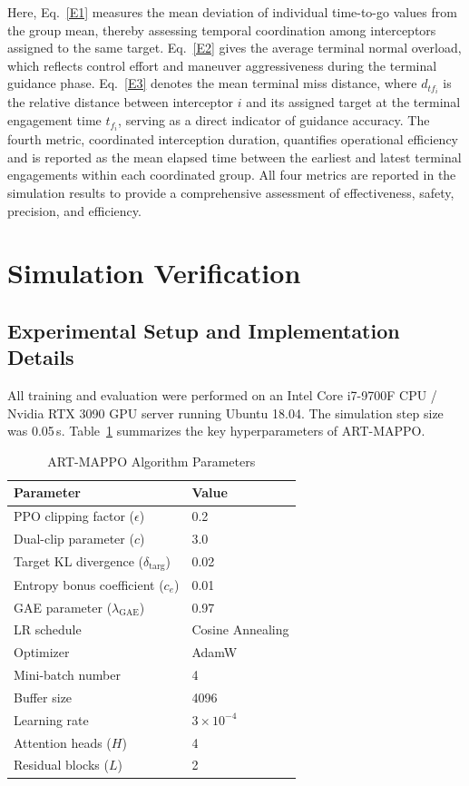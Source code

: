 \documentclass[lettersize,journal]{IEEEtran}
\begin{document}
Here, Eq.~\eqref{E1} measures the mean deviation of individual time-to-go values from the group mean, thereby assessing temporal coordination among interceptors assigned to the same target. Eq.~\eqref{E2} gives the average terminal normal overload, which reflects control effort and maneuver aggressiveness during the terminal guidance phase. Eq.~\eqref{E3} denotes the mean terminal miss distance, where $d_{tf_i}$ is the relative distance between interceptor $i$ and its assigned target at the terminal engagement time $t_{f_i}$, serving as a direct indicator of guidance accuracy. The fourth metric, coordinated interception duration, quantifies operational efficiency and is reported as the mean elapsed time between the earliest and latest terminal engagements within each coordinated group. All four metrics are reported in the simulation results to provide a comprehensive assessment of effectiveness, safety, precision, and efficiency.










\section{Simulation Verification}
\label{sec:simulation}

\subsection{Experimental Setup and Implementation Details}
\label{subsec:setup}

All training and evaluation were performed on an Intel Core i7-9700F CPU / Nvidia RTX 3090
GPU server running Ubuntu 18.04.
The simulation step size was 0.05\,s.
Table~\ref{table2} summarizes the key hyperparameters of ART-MAPPO.

\begin{table}[!t]
\centering
\renewcommand{\arraystretch}{1.4}
\caption{ART-MAPPO Algorithm Parameters}
\label{table2}
\begin{tabular}{ll}
\hline\hline
Parameter & Value \\ \hline
PPO clipping factor ($\epsilon$) & 0.2 \\
Dual-clip parameter ($c$) & 3.0 \\
Target KL divergence ($\delta_{\text{targ}}$) & 0.02 \\
Entropy bonus coefficient ($c_e$) & 0.01 \\
GAE parameter ($\lambda_{\mathrm{GAE}}$) & 0.97 \\
LR schedule & Cosine Annealing \\
Optimizer & AdamW \\
Mini-batch number & 4 \\
Buffer size & 4096 \\
Learning rate & $3\times10^{-4}$ \\
Attention heads ($H$) & 4 \\
Residual blocks ($L$) & 2 \\ \hline
\end{tabular}
\end{table}
\end{document}
